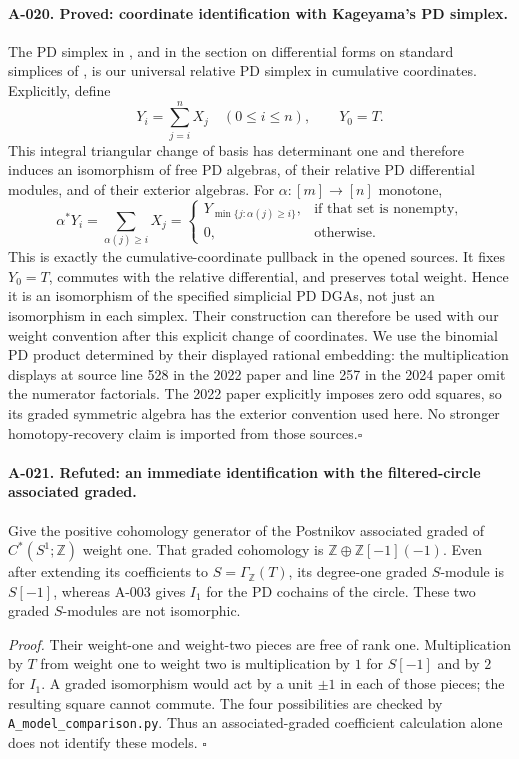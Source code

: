 \paragraph{A-020. Proved: coordinate identification with Kageyama's PD simplex.}
The PD simplex in \cite[\S2.1]{A_Kageyama2022}, and in the section
on differential forms on standard simplices of
\cite{A_Kageyama2024}, is our universal relative PD simplex in
cumulative coordinates. Explicitly, define
\[
 Y_i=\sum_{j=i}^nX_j\quad(0\leq i\leq n),\qquad Y_0=T.
\]
This integral triangular change of basis has determinant one and
therefore induces an isomorphism of free PD algebras, of their
relative PD differential modules, and of their exterior algebras.
For $\alpha:[m]\to[n]$ monotone,
\[
 \alpha^*Y_i=\sum_{\alpha(j)\geq i}X_j
 =\begin{cases}
 Y_{\min\{j:\alpha(j)\geq i\}},&\text{if that set is nonempty},\\
 0,&\text{otherwise}.
 \end{cases}
\]
This is exactly the cumulative-coordinate pullback in the opened
sources. It fixes $Y_0=T$, commutes with the relative differential,
and preserves total weight. Hence it is an isomorphism of the
specified simplicial PD DGAs, not just an isomorphism in each
simplex. Their construction can therefore be used with our
weight convention after this explicit change of coordinates.
We use the binomial PD product determined by their displayed
rational embedding: the multiplication displays at source line
528 in the 2022 paper and line 257 in the 2024 paper omit the
numerator factorials. The 2022 paper explicitly imposes zero odd
squares, so its graded symmetric algebra has the exterior
convention used here. No stronger homotopy-recovery claim is
imported from those sources.\hfill$\square$

\paragraph{A-021. Refuted: an immediate identification with the filtered-circle associated graded.}
Give the positive cohomology generator of the Postnikov associated
graded of $C^*(S^1;\mathbb Z)$ weight one. That graded cohomology
is $\mathbb Z\oplus\mathbb Z[-1](-1)$. Even after extending its
coefficients to $S=\Gamma_{\mathbb Z}(T)$, its degree-one graded
$S$-module is $S[-1]$, whereas A-003 gives $I_1$ for the PD
cochains of the circle. These two graded $S$-modules are not
isomorphic.

\emph{Proof.}
Their weight-one and weight-two pieces are free of rank one.
Multiplication by $T$ from weight one to weight two is multiplication
by $1$ for $S[-1]$ and by $2$ for $I_1$. A graded isomorphism
would act by a unit $\pm1$ in each of those pieces; the resulting
square cannot commute. The four possibilities are checked by
\texttt{A\_model\_comparison.py}. Thus an associated-graded
coefficient calculation alone does not identify these models.
\hfill$\square$

